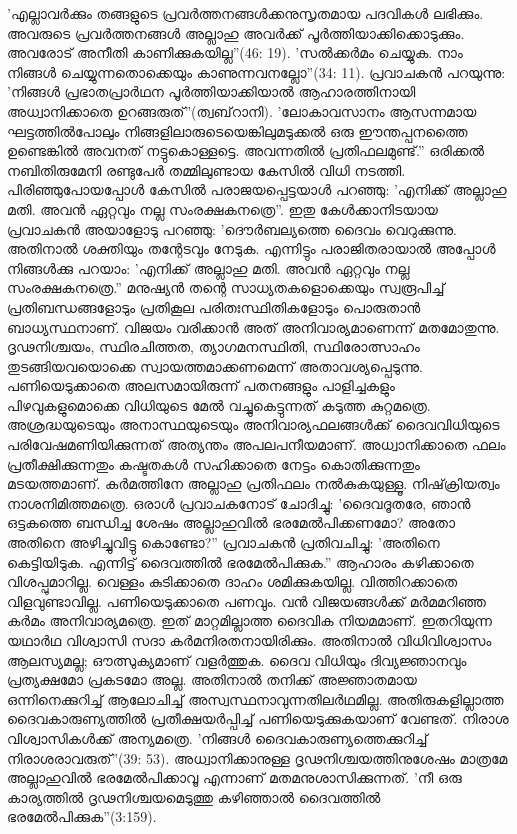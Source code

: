 'എല്ലാവര്‍ക്കും തങ്ങളുടെ പ്രവര്‍ത്തനങ്ങള്‍ക്കനുസൃതമായ പദവികള്‍ ലഭിക്കും. അവരുടെ പ്രവര്‍ത്തനങ്ങള്‍ അല്ലാഹു അവര്‍ക്ക് പൂര്‍ത്തിയാക്കിക്കൊടുക്കും. അവരോട് അനീതി കാണിക്കുകയില്ല''(46: 19). 'സല്‍ക്കര്‍മം ചെയ്യുക. നാം നിങ്ങള്‍ ചെയ്യുന്നതൊക്കെയും കാണുന്നവനല്ലോ''(34: 11).
പ്രവാചകന്‍ പറയുന്നു: 'നിങ്ങള്‍ പ്രഭാതപ്രാര്‍ഥന പൂര്‍ത്തിയാക്കിയാല്‍ ആഹാരത്തിനായി അധ്വാനിക്കാതെ ഉറങ്ങരുത്''(ത്വബ്‌റാനി). 'ലോകാവസാനം ആസന്നമായ ഘട്ടത്തില്‍പോലും നിങ്ങളിലാരുടെയെങ്കിലുമടുക്കല്‍ ഒരു ഈന്തപ്പനത്തൈ ഉണ്ടെങ്കില്‍ അവനത് നട്ടുകൊള്ളട്ടെ. അവന്നതില്‍ പ്രതിഫലമുണ്ട്.''
ഒരിക്കല്‍ നബിതിരുമേനി രണ്ടുപേര്‍ തമ്മിലുണ്ടായ കേസില്‍ വിധി നടത്തി. പിരിഞ്ഞുപോയപ്പോള്‍ കേസില്‍ പരാജയപ്പെട്ടയാള്‍ പറഞ്ഞു: 'എനിക്ക് അല്ലാഹു മതി. അവന്‍ ഏറ്റവും നല്ല സംരക്ഷകനത്രെ''. ഇതു കേള്‍ക്കാനിടയായ പ്രവാചകന്‍ അയാളോടു പറഞ്ഞു: 'ദൌര്‍ബല്യത്തെ ദൈവം വെറുക്കുന്നു. അതിനാല്‍ ശക്തിയും തന്റേടവും നേടുക. എന്നിട്ടും പരാജിതരായാല്‍ അപ്പോള്‍ നിങ്ങള്‍ക്കു പറയാം: 'എനിക്ക് അല്ലാഹു മതി. അവന്‍ ഏറ്റവും നല്ല സംരക്ഷകനത്രെ.''
മനുഷ്യന്‍ തന്റെ സാധ്യതകളൊക്കെയും സ്വരൂപിച്ച് പ്രതിബന്ധങ്ങളോടും പ്രതികൂല പരിതഃസ്ഥിതികളോടും പൊരുതാന്‍ ബാധ്യസ്ഥനാണ്. വിജയം വരിക്കാന്‍ അത് അനിവാര്യമാണെന്ന് മതമോതുന്നു. ദൃഢനിശ്ചയം, സ്ഥിരചിത്തത, ത്യാഗമനസ്ഥിതി, സ്ഥിരോത്സാഹം തുടങ്ങിയവയൊക്കെ സ്വായത്തമാക്കണമെന്ന് അതാവശ്യപ്പെടുന്നു. പണിയെടുക്കാതെ അലസമായിരുന്ന് പതനങ്ങളും പാളിച്ചകളും പിഴവുകളുമൊക്കെ വിധിയുടെ മേല്‍ വച്ചുകെട്ടുന്നത് കടുത്ത കുറ്റമത്രെ. അശ്രദ്ധയുടെയും അനാസ്ഥയുടെയും അനിവാര്യഫലങ്ങള്‍ക്ക് ദൈവവിധിയുടെ പരിവേഷമണിയിക്കുന്നത് അത്യന്തം അപലപനീയമാണ്. അധ്വാനിക്കാതെ ഫലം പ്രതീക്ഷിക്കുന്നതും കഷ്ടതകള്‍ സഹിക്കാതെ നേട്ടം കൊതിക്കുന്നതും മടയത്തമാണ്. കര്‍മത്തിനേ അല്ലാഹു പ്രതിഫലം നല്‍കുകയുള്ളൂ. നിഷ്‌ക്രിയത്വം നാശനിമിത്തമത്രെ.
ഒരാള്‍ പ്രവാചകനോട് ചോദിച്ചു: 'ദൈവദൂതരേ, ഞാന്‍ ഒട്ടകത്തെ ബന്ധിച്ച ശേഷം അല്ലാഹുവില്‍ ഭരമേല്‍പിക്കണമോ? അതോ അതിനെ അഴിച്ചുവിട്ടു കൊണ്ടോ?'' പ്രവാചകന്‍ പ്രതിവചിച്ചു: 'അതിനെ കെട്ടിയിടുക. എന്നിട്ട് ദൈവത്തില്‍ ഭരമേല്‍പിക്കുക.''
ആഹാരം കഴിക്കാതെ വിശപ്പുമാറില്ല. വെള്ളം കുടിക്കാതെ ദാഹം ശമിക്കുകയില്ല. വിത്തിറക്കാതെ വിളവുണ്ടാവില്ല. പണിയെടുക്കാതെ പണവും. വന്‍ വിജയങ്ങള്‍ക്ക് മര്‍മമറിഞ്ഞ കര്‍മം അനിവാര്യമത്രെ. ഇത് മാറ്റമില്ലാത്ത ദൈവിക നിയമമാണ്. ഇതറിയുന്ന യഥാര്‍ഥ വിശ്വാസി സദാ കര്‍മനിരതനായിരിക്കും. അതിനാല്‍ വിധിവിശ്വാസം ആലസ്യമല്ല; ഔത്സുക്യമാണ് വളര്‍ത്തുക.
ദൈവ വിധിയും ദിവ്യജ്ഞാനവും പ്രത്യക്ഷമോ പ്രകടമോ അല്ല. അതിനാല്‍ തനിക്ക് അജ്ഞാതമായ ഒന്നിനെക്കുറിച്ച് ആലോചിച്ച് അസ്വസ്ഥനാവുന്നതിലര്‍ഥമില്ല. അതിരുകളില്ലാത്ത ദൈവകാരുണ്യത്തില്‍ പ്രതീക്ഷയര്‍പ്പിച്ച് പണിയെടുക്കുകയാണ് വേണ്ടത്. നിരാശ വിശ്വാസികള്‍ക്ക് അന്യമത്രെ. 'നിങ്ങള്‍ ദൈവകാരുണ്യത്തെക്കുറിച്ച് നിരാശരാവരുത്''(39: 53).
അധ്വാനിക്കാനുള്ള ദൃഢനിശ്ചയത്തിനുശേഷം മാത്രമേ അല്ലാഹുവില്‍ ഭരമേല്‍പിക്കാവൂ എന്നാണ് മതമനുശാസിക്കുന്നത്. 'നീ ഒരു കാര്യത്തില്‍ ദൃഢനിശ്ചയമെടുത്തു കഴിഞ്ഞാല്‍ ദൈവത്തില്‍ ഭരമേല്‍പിക്കുക''(3:159).

